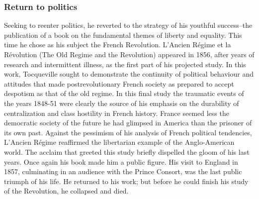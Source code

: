 \documentclass[12pt]{article}
\begin{document}
\subsubsection{Return to politics}
Seeking to reenter politics, he reverted to the strategy of his
                                      youthful success--the publication of a book on the fundamental
                                      themes of liberty and equality. This time he chose as his subject the
                                      French Revolution. L'Ancien R\'{e}gime et la R\'{e}volution (The Old
                                      Regime and the Revolution) appeared in 1856, after years of research
                                      and intermittent illness, as the first part of his projected study. In
                                      this work, Tocqueville sought to demonstrate the continuity of
                                      political behaviour and attitudes that made postrevolutionary French
                                      society as prepared to accept despotism as that of the old regime. In
                                      this final study the traumatic events of the years 1848-51 were
                                      clearly the source of his emphasis on the durability of centralization
                                      and class hostility in French history. France seemed less the
                                      democratic society of the future he had glimpsed in America than the
                                      prisoner of its own past. Against the pessimism of his analysis of
                                      French political tendencies, L'Ancien R\'{e}gime reaffirmed the
                                      libertarian example of the Anglo-American world. The acclaim that
                                      greeted this study briefly dispelled the gloom of his last years. Once
                                      again his book made him a public figure. His visit to England in 1857,
                                      culminating in an audience with the Prince Consort, was the last
                                      public triumph of his life. He returned to his work; but before he could
                                      finish his study of the Revolution, he collapsed and died. 
\end{document}
